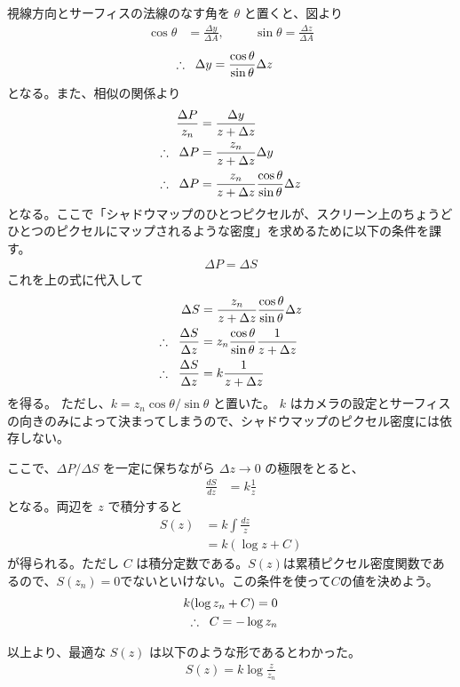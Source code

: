 \documentclass[dvipdfmx,uplatex]{jsarticle}
\newcommand{\Therefore}{\therefore \hspace{2mm}}
\begin{document}
視線方向とサーフィスの法線のなす角を $\theta$ と置くと、図より
\begin{align*}
  \cos \theta &= \frac{\Delta y}{\Delta A}, \hspace{1cm} \sin \theta = \frac{\Delta z}{\Delta A}
\end{align*}
\begin{align*}
  \Therefore \Delta y &= \frac{\cos \theta}{\sin \theta} \Delta z
\end{align*}
となる。また、相似の関係より
\begin{align*}
  \frac{\Delta P}{z_n} &= \frac{\Delta y}{z + \Delta z} \\
  \Therefore \Delta P &= \frac{z_n}{z + \Delta z} \Delta y \\
  \Therefore \Delta P &= \frac{z_n}{z + \Delta z} \frac{\cos \theta}{\sin \theta} \Delta z
\end{align*}
となる。ここで「シャドウマップのひとつピクセルが、スクリーン上のちょうどひとつのピクセルにマップされるような密度」を求めるために以下の条件を課す。
\begin{align*}
  \Delta P = \Delta S
\end{align*}
これを上の式に代入して
\begin{align*}
  \Delta S &= \frac{z_n}{z + \Delta z} \frac{\cos \theta}{\sin \theta} \Delta z \\
  \Therefore \frac{\Delta S}{\Delta z} &= z_n \frac{\cos \theta}{\sin \theta} \frac{1}{z + \Delta z} \\
  \Therefore \frac{\Delta S}{\Delta z} &= k \frac{1}{z + \Delta z}
\end{align*}
を得る。
ただし、$k = z_n \cos \theta / \sin \theta$ と置いた。
$k$ はカメラの設定とサーフィスの向きのみによって決まってしまうので、シャドウマップのピクセル密度には依存しない。

ここで、$\Delta P / \Delta S$ を一定に保ちながら $\Delta z \rightarrow 0$ の極限をとると、
\begin{align*}
  \frac{dS}{dz} &= k \frac{1}{z}
\end{align*}
となる。両辺を $z$ で積分すると
\begin{align*}
  S(z) &= k \int \frac{dz}{z} \\
       &= k (\log z + C)
\end{align*}
が得られる。ただし $C$ は積分定数である。$S(z)$は累積ピクセル密度関数であるので、$S(z_n)=0$でないといけない。この条件を使って$C$の値を決めよう。
\begin{align*}
  k (\log z_n + C) = 0 \\
  \Therefore C = -\log z_n
\end{align*}

以上より、最適な $S(z)$ は以下のような形であるとわかった。
\begin{align*}
  S(z) = k \log \frac{z}{z_n}
\end{align*}
\end{document}
